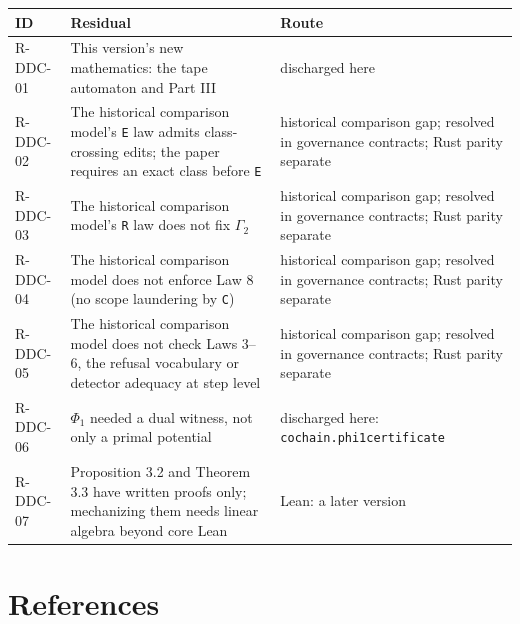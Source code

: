 \documentclass[
  11pt,
]{article}
\renewcommand{\_}{\ddcunderscore\allowbreak}
\begin{document}
\begin{longtable}[]{@{}
  >{\raggedright\arraybackslash}p{}
  >{\raggedright\arraybackslash}p{}
  >{\raggedright\arraybackslash}p{}@{}}
\toprule\noalign{}
\begin{minipage}[b]{\linewidth}\raggedright
ID
\end{minipage} & \begin{minipage}[b]{\linewidth}\raggedright
Residual
\end{minipage} & \begin{minipage}[b]{\linewidth}\raggedright
Route
\end{minipage} \\
\midrule\noalign{}
\endhead
\bottomrule\noalign{}
\endlastfoot
R-DDC-01 & This version's new mathematics: the tape automaton and Part
III & discharged here \\
R-DDC-02 & The historical comparison model's \texttt{E} law admits
class-crossing edits; the paper requires an exact class before
\texttt{E} & historical comparison gap; resolved in governance
contracts; Rust parity separate \\
R-DDC-03 & The historical comparison model's \texttt{R} law does not fix
\(\Gamma_2\) & historical comparison gap; resolved in governance
contracts; Rust parity separate \\
R-DDC-04 & The historical comparison model does not enforce Law 8 (no
scope laundering by \texttt{C}) & historical comparison gap; resolved in
governance contracts; Rust parity separate \\
R-DDC-05 & The historical comparison model does not check Laws 3--6, the
refusal vocabulary or detector adequacy at step level & historical
comparison gap; resolved in governance contracts; Rust parity
separate \\
R-DDC-06 & \(\Phi_1\) needed a dual witness, not only a primal potential
& discharged here: \texttt{cochain.\allowbreak phi1\_certificate} \\
R-DDC-07 & Proposition 3.2 and Theorem 3.3 have written proofs only;
mechanizing them needs linear algebra beyond core Lean & Lean: a later
version \\
\end{longtable}

\section{References}\label{references}
\end{document}
